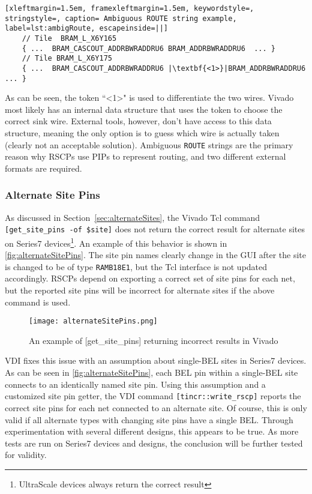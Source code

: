 \begin{lstlisting}[xleftmargin=1.5em, framexleftmargin=1.5em, keywordstyle=,
stringstyle=, caption= Ambiguous ROUTE string example, label=lst:ambigRoute, escapeinside=||]
	// Tile  BRAM_L_X6Y165
	{ ...  BRAM_CASCOUT_ADDRBWRADDRU6 BRAM_ADDRBWRADDRU6  ... }
	// Tile BRAM_L_X6Y175 
	{ ...  BRAM_CASCOUT_ADDRBWRADDRU6 |\textbf{<1>}|BRAM_ADDRBWRADDRU6  ... }
\end{lstlisting}

\noindent As can be seen, the token ``\textless1\textgreater" is used to
differentiate the two wires. Vivado most likely has an internal data
structure that uses the token to choose the correct sink wire.  External
tools, however, don't have access to this data structure, meaning the only
option is to guess which wire is actually taken (clearly not an acceptable
solution). Ambiguous \texttt{ROUTE} strings are the primary reason why RSCPs use
PIPs to represent routing, and two different external formats are required.
 
\subsubsection{Alternate Site Pins}

As discussed in Section~\ref{sec:alternateSites}, the Vivado Tcl command
\texttt{[get\_site\_pins -of \$site]} does not return the correct result for
alternate sites on Series7 devices\footnote{UltraScale devices always return
the correct result}. An example of this behavior is shown in
\autoref{fig:alternateSitePins}. The site pin names clearly change in the GUI
after the site is changed to be of type \texttt{RAMB18E1}, but the Tcl
interface is not updated accordingly. RSCPs depend on exporting a correct set
of site pins for each net, but the reported site pins will be incorrect for
alternate sites if the above command is used.

\begin{figure}[h!]
  \centering
  \texttt{[image: alternateSitePins.png]}
  \caption{An example of [get\_site\_pins] returning incorrect results in
  Vivado}
  \label{fig:alternateSitePins}
\end{figure}

VDI fixes this issue with an assumption about single-BEL sites in Series7
devices. As can be seen in \autoref{fig:alternateSitePins}, each BEL pin within
a single-BEL site connects to an identically named site pin. Using this
assumption and a customized site pin getter, the VDI command
\texttt{[tincr::write\_rscp]} reports the correct site pins for each net
connected to an alternate site. Of course, this is only valid if all alternate
types with changing site pins have a single BEL. Through experimentation
with several different designs, this appears to be true. As more tests are run
on Series7 devices and designs, the conclusion will be further tested for
validity.

